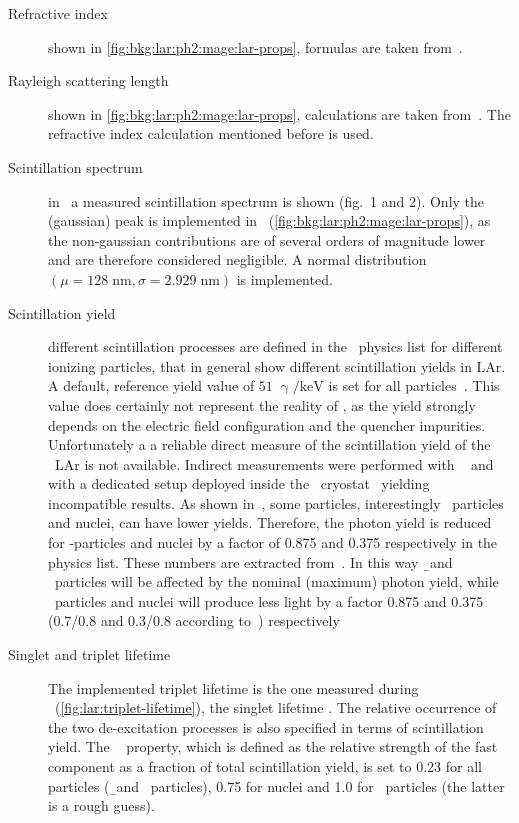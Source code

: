 \begin{description}

  \item[Refractive index] shown in \cref{fig:bkg:lar:ph2:mage:lar-props}, formulas are
    taken from~\cite{Bideau-Mehu1981}.

  \item[Rayleigh scattering length] shown in \cref{fig:bkg:lar:ph2:mage:lar-props},
    calculations are taken from~\cite{Seidel2002}. The refractive index calculation
    mentioned before is used.

  \item[Scintillation spectrum] in~\cite{Heindl2010} a measured scintillation spectrum
    is shown (fig.~1 and 2). Only the (gaussian) peak is implemented in \mage\
    (\cref{fig:bkg:lar:ph2:mage:lar-props}), as the non-gaussian contributions are of several
    orders of magnitude lower and are therefore considered negligible.  A normal
    distribution $(\mu=128\;\text{nm}, \sigma=2.929\;\text{nm})$ is implemented.

  \item[Scintillation yield] different scintillation processes are defined in the \mage\
    physics list for different ionizing particles, that in general show different
    scintillation yields in LAr. A default, reference yield value of
    $51\;\upgamma/\text{keV}$ is set for all particles~\cite{Doke2002}. This value does
    certainly not represent the reality of \gerda, as the yield strongly depends on the
    electric field configuration and the quencher impurities. Unfortunately a a reliable
    direct measure of the scintillation yield of the \gerda\ LAr is not available.
    Indirect measurements were performed with \large~\cite{Lehnert2015} and with a
    dedicated setup deployed inside the \gerda\ cryostat~\cite{Barros2020} yielding
    incompatible results. As shown in~\cite{Doke2002}, some particles, interestingly \a\
    particles and nuclei, can have lower yields.  Therefore, the photon yield is reduced
    for \a-particles and nuclei by a factor of 0.875 and 0.375 respectively in the physics
    list. These numbers are extracted from~\cite{Doke2002}. In this way \b\ and \g\
    particles will be affected by the nominal (maximum) photon yield, while \a\ particles
    and nuclei will produce less light by a factor 0.875 and 0.375 (0.7/0.8 and 0.3/0.8
    according to~\cite{Doke2002}) respectively

  \item[Singlet and triplet lifetime] \sloppy The implemented triplet lifetime is the one
    measured during \gerdatwo\ (\cref{fig:lar:triplet-lifetime}), the singlet lifetime
    \fillme{fillme}. The relative occurrence of the two de-excitation processes is also
    specified in terms of scintillation yield. The \geant\  property, which
    is defined as the relative strength of the fast component as a fraction of total
    scintillation yield, is set to 0.23 for all particles (\b\ and \g\ particles), 0.75
    for nuclei and 1.0 for \a\ particles (the latter is a rough guess).


\end{description}
